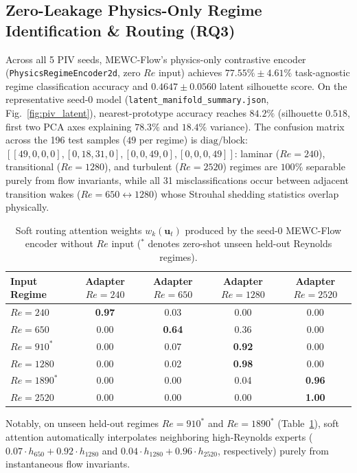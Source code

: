 \documentclass[11pt,a4paper]{article}
\begin{document}
\FloatBarrier
\subsection{Zero-Leakage Physics-Only Regime Identification \& Routing (RQ3)}

Across all 5 PIV seeds, MEWC-Flow's physics-only contrastive encoder (\texttt{PhysicsRegimeEncoder2d}, zero $Re$ input) achieves $\mathbf{77.55\% \pm 4.61\%}$ task-agnostic regime classification accuracy and $\mathbf{0.4647 \pm 0.0560}$ latent silhouette score. On the representative seed-0 model (\texttt{latent\_manifold\_summary.json}, Fig.~\ref{fig:piv_latent}), nearest-prototype accuracy reaches $\mathbf{84.2\%}$ (silhouette $0.518$, first two PCA axes explaining $78.3\%$ and $18.4\%$ variance). The confusion matrix across the 196 test samples ($49$ per regime) is $\text{diag}/$block: $[[49, 0, 0, 0], [0, 18, 31, 0], [0, 0, 49, 0], [0, 0, 0, 49]]$: laminar ($Re=240$), transitional ($Re=1280$), and turbulent ($Re=2520$) regimes are $100\%$ separable purely from flow invariants, while all 31 misclassifications occur between adjacent transition wakes ($Re=650 \leftrightarrow 1280$) whose Strouhal shedding statistics overlap physically.

\begin{table}[!htbp]
\centering
\caption{Soft routing attention weights $w_k(\mathbf{u}_t)$ produced by the seed-0 MEWC-Flow encoder without $Re$ input ($^*$ denotes zero-shot unseen held-out Reynolds regimes).}
\label{tab:routing_weights}
\begin{tabular}{@{}lcccc@{}}
\toprule
Input Regime & Adapter $Re=240$ & Adapter $Re=650$ & Adapter $Re=1280$ & Adapter $Re=2520$ \\
\midrule
$Re=240$ & \textbf{0.97} & 0.03 & 0.00 & 0.00 \\
$Re=650$ & 0.00 & \textbf{0.64} & 0.36 & 0.00 \\
$Re=910^*$ & 0.00 & 0.07 & \textbf{0.92} & 0.00 \\
$Re=1280$ & 0.00 & 0.02 & \textbf{0.98} & 0.00 \\
$Re=1890^*$ & 0.00 & 0.00 & 0.04 & \textbf{0.96} \\
$Re=2520$ & 0.00 & 0.00 & 0.00 & \textbf{1.00} \\
\bottomrule
\end{tabular}
\end{table}

Notably, on unseen held-out regimes $Re=910^*$ and $Re=1890^*$ (Table~\ref{tab:routing_weights}), soft attention automatically interpolates neighboring high-Reynolds experts ($0.07 \cdot h_{650} + 0.92 \cdot h_{1280}$ and $0.04 \cdot h_{1280} + 0.96 \cdot h_{2520}$, respectively) purely from instantaneous flow invariants.
\end{document}
